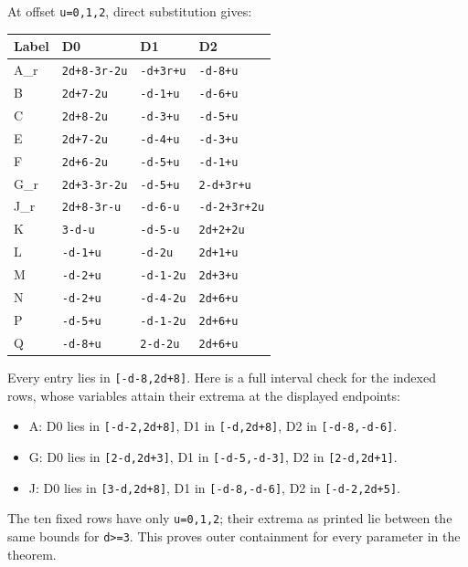 \documentclass[
  10pt,
]{scrreprt}
\providecommand{\tightlist}{%
  \setlength{\itemsep}{0pt}\setlength{\parskip}{0pt}}
\begin{document}
At offset \texttt{u=0,1,2}, direct substitution gives:

\begin{longtable}[]{@{}llll@{}}
\toprule\noalign{}
Label & D0 & D1 & D2 \\
\midrule\noalign{}
\endhead
\bottomrule\noalign{}
\endlastfoot
A\_r & \texttt{2d+8-3r-2u} & \texttt{-d+3r+u} & \texttt{-d-8+u} \\
B & \texttt{2d+7-2u} & \texttt{-d-1+u} & \texttt{-d-6+u} \\
C & \texttt{2d+8-2u} & \texttt{-d-3+u} & \texttt{-d-5+u} \\
E & \texttt{2d+7-2u} & \texttt{-d-4+u} & \texttt{-d-3+u} \\
F & \texttt{2d+6-2u} & \texttt{-d-5+u} & \texttt{-d-1+u} \\
G\_r & \texttt{2d+3-3r-2u} & \texttt{-d-5+u} & \texttt{2-d+3r+u} \\
J\_r & \texttt{2d+8-3r-u} & \texttt{-d-6-u} & \texttt{-d-2+3r+2u} \\
K & \texttt{3-d-u} & \texttt{-d-5-u} & \texttt{2d+2+2u} \\
L & \texttt{-d-1+u} & \texttt{-d-2u} & \texttt{2d+1+u} \\
M & \texttt{-d-2+u} & \texttt{-d-1-2u} & \texttt{2d+3+u} \\
N & \texttt{-d-2+u} & \texttt{-d-4-2u} & \texttt{2d+6+u} \\
P & \texttt{-d-5+u} & \texttt{-d-1-2u} & \texttt{2d+6+u} \\
Q & \texttt{-d-8+u} & \texttt{2-d-2u} & \texttt{2d+6+u} \\
\end{longtable}

Every entry lies in \texttt{{[}-d-8,2d+8{]}}. Here is a full interval
check for the indexed rows, whose variables attain their extrema at the
displayed endpoints:

\begin{itemize}
\tightlist
\item
  A: D0 lies in \texttt{{[}-d-2,2d+8{]}}, D1 in \texttt{{[}-d,2d+8{]}},
  D2 in \texttt{{[}-d-8,-d-6{]}}.
\item
  G: D0 lies in \texttt{{[}2-d,2d+3{]}}, D1 in \texttt{{[}-d-5,-d-3{]}},
  D2 in \texttt{{[}2-d,2d+1{]}}.
\item
  J: D0 lies in \texttt{{[}3-d,2d+8{]}}, D1 in \texttt{{[}-d-8,-d-6{]}},
  D2 in \texttt{{[}-d-2,2d+5{]}}.
\end{itemize}

The ten fixed rows have only \texttt{u=0,1,2}; their extrema as printed
lie between the same bounds for \texttt{d\textgreater{}=3}. This proves
outer containment for every parameter in the theorem.
\end{document}
